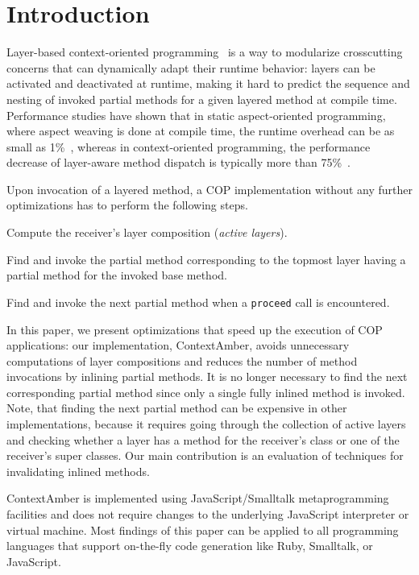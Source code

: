 \documentclass{sig-alternate}
\begin{document}
\section{Introduction}
Layer-based context-oriented programming~\cite{hirschfeld2008context} is a way to modularize crosscutting concerns that can dynamically adapt their runtime behavior: layers can be activated and deactivated at runtime, making it hard to predict the sequence and nesting of invoked partial methods for a given layered method at compile time. Performance studies have shown that in static aspect-oriented programming, where aspect weaving is done at compile time, the runtime overhead can be as small as 1\%~\cite{Colyer:2003:UAC:949344.949440}, whereas in context-oriented programming, the performance decrease of layer-aware method dispatch is typically more than 75\%~\cite{Appeltauer:2009:CCP:1562112.1562118}.

Upon invocation of a layered method, a COP implementation without any further optimizations has to perform the following steps.
\begin{compact_enum}
    \item Compute the receiver's layer composition (\emph{active layers}).
    \item Find and invoke the partial method corresponding to the topmost layer having a partial method for the invoked base method.
    \item Find and invoke the next partial method when a \texttt{proceed} call is encountered.
\end{compact_enum}

In this paper, we present optimizations that speed up the execution of COP applications: our implementation, ContextAmber, avoids unnecessary computations of layer compositions and reduces the number of method invocations by inlining partial methods. It is no longer necessary to find the next corresponding partial method since only a single fully inlined method is invoked. Note, that finding the next partial method can be expensive in other implementations, because it
requires going through the collection of active layers and checking whether a layer has a method for the receiver's class or one of the receiver's super classes. Our main contribution is an evaluation of techniques for invalidating inlined methods. 

ContextAmber is implemented using JavaScript/Smalltalk metaprogramming facilities and does not require changes to the underlying JavaScript interpreter or virtual machine. Most findings of this paper can be applied to all programming languages that support on-the-fly code generation like Ruby, Smalltalk, or JavaScript.
\end{document}

